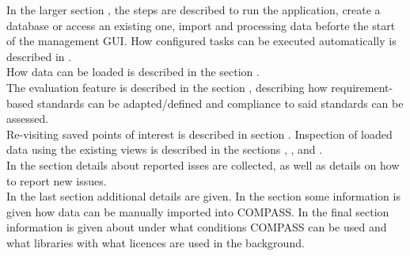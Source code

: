 In the larger section , the steps are described to run the application, create a database or access an existing one, import and processing data beforte the start of the management GUI. How configured tasks can be executed automatically is described in . \\

How data can be loaded is described in the section . \\

The evaluation feature is described in the section , describing how requirement-based standards can be adapted/defined and compliance to said standards can be assessed. \\

Re-visiting saved points of interest is described in section . Inspection of loaded data using the existing views is described in the sections , ,  and . \\

In the section  details about reported isses are collected, as well as details on how to report new issues. \\

In the last section  additional details are given. In the section  some information is given how data can be manually imported into COMPASS. In the final section  information is given about under what conditions COMPASS can be used and what 
libraries with what licences are used in the background.

\pagebreak



%








